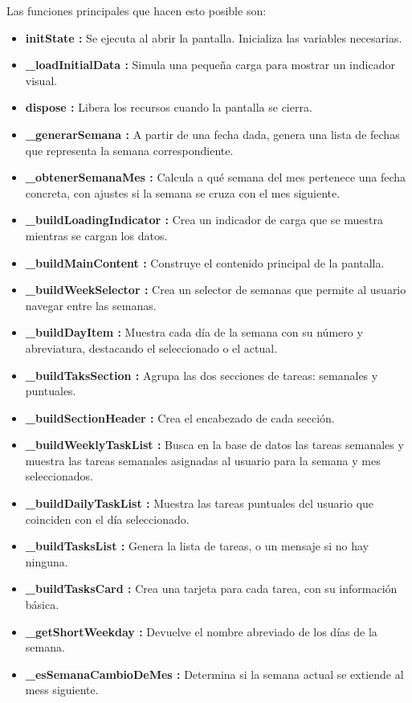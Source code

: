 Las funciones principales que hacen esto posible son: 
\begin{itemize}
    \item \textbf{initState :} Se ejecuta al abrir la pantalla. Inicializa las variables necesarias.
    \item \textbf{\_loadInitialData :} Simula una pequeña carga para mostrar un indicador visual.
    \item \textbf{dispose :} Libera los recursos cuando la pantalla se cierra.
    \item \textbf{\_generarSemana :} A partir de una fecha dada, genera una lista de fechas que representa la semana correspondiente.
    \item \textbf{\_obtenerSemanaMes :} Calcula a qué semana del mes pertenece una fecha concreta, con ajustes si la semana se cruza con el mes siguiente.
    \item \textbf{\_buildLoadingIndicator :} Crea un indicador de carga que se muestra mientras se cargan los datos.
    \item \textbf{\_buildMainContent :} Construye el contenido principal de la pantalla.
    \item \textbf{\_buildWeekSelector :} Crea un selector de semanas que permite al usuario navegar entre las semanas.
    \item \textbf{\_buildDayItem :} Muestra cada día de la semana con su número y abreviatura, destacando el seleccionado o el actual.
    \item \textbf{\_buildTaksSection :} Agrupa las dos secciones de tareas: semanales y puntuales.
    \item \textbf{\_buildSectionHeader :} Crea el encabezado de cada sección.
    \item \textbf{\_buildWeeklyTaskList :} Busca en la base de datos las tareas semanales y muestra las tareas semanales asignadas al usuario para la semana y mes seleccionados.
    \item \textbf{\_buildDailyTaskList :} Muestra las tareas puntuales del usuario que coinciden con el día seleccionado.
    \item \textbf{\_buildTasksList :} Genera la lista de tareas, o un mensaje si no hay ninguna.
    \item \textbf{\_buildTasksCard :} Crea una tarjeta para cada tarea, con su información básica.
    \item \textbf{\_getShortWeekday :} Devuelve el nombre abreviado de los días de la semana.
    \item \textbf{\_esSemanaCambioDeMes :} Determina si la semana actual se extiende al mess siguiente.

\end{itemize}
